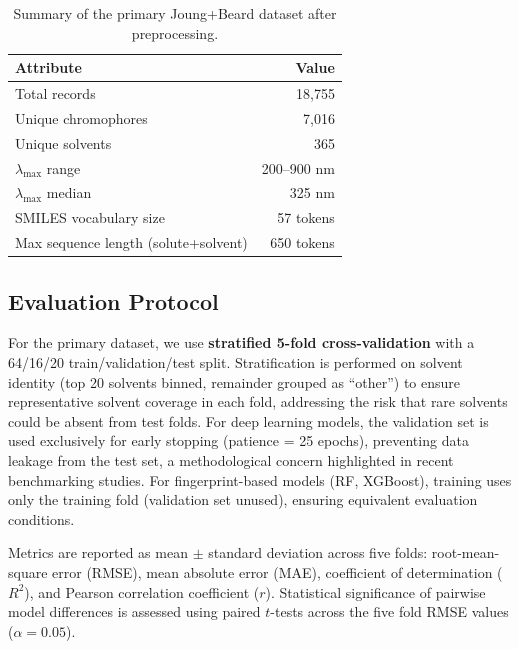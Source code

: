 \begin{table}[htbp]
\centering
\caption{Summary of the primary Joung+Beard dataset after preprocessing.}
\label{tab:dataset_summary}
\begin{tabular}{lr}
\toprule
\textbf{Attribute} & \textbf{Value} \\
\midrule
Total records & 18,755 \\
Unique chromophores & 7,016 \\
Unique solvents & 365 \\
$\lambda_{\max}$ range & 200--900 nm \\
$\lambda_{\max}$ median & 325 nm \\
SMILES vocabulary size & 57 tokens \\
Max sequence length (solute+solvent) & 650 tokens \\
\bottomrule
\end{tabular}
\end{table}


\subsection{Evaluation Protocol}
\label{sec:evaluation}

For the primary dataset, we use \textbf{stratified 5-fold cross-validation}\cite{kohavi1995study} with a 64/16/20 train/validation/test split.
Stratification is performed on solvent identity (top 20 solvents binned, remainder grouped as ``other'') to ensure representative solvent coverage in each fold, addressing the risk that rare solvents could be absent from test folds.
For deep learning models, the validation set is used exclusively for early stopping (patience = 25 epochs), preventing data leakage from the test set, a methodological concern highlighted in recent benchmarking studies\cite{panapitiya2022evaluation}.
For fingerprint-based models (RF, XGBoost), training uses only the training fold (validation set unused), ensuring equivalent evaluation conditions.

Metrics are reported as mean $\pm$ standard deviation across five folds: root-mean-square error (RMSE), mean absolute error (MAE), coefficient of determination ($R^2$), and Pearson correlation coefficient ($r$).
Statistical significance of pairwise model differences is assessed using paired $t$-tests across the five fold RMSE values ($\alpha = 0.05$).

